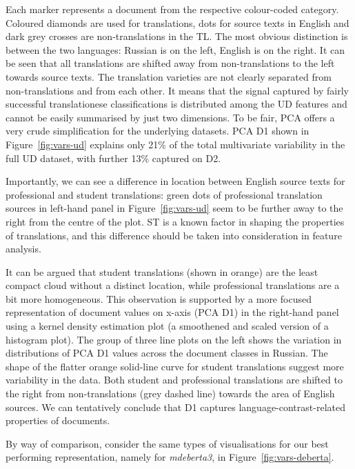 Each marker represents a document from the respective colour-coded category. Coloured diamonds are used for translations, dots for source texts in English and dark grey crosses are non-translations in the TL. 
The most obvious distinction is between the two languages: Russian is on the left, English is on the right. 
It can be seen that all translations are shifted away from non-translations to the left towards source texts. 
The translation varieties are not clearly separated from non-translations and from each other. It means that the signal captured by fairly successful translationese classifications is distributed among the UD features and cannot be easily summarised by just two dimensions.
To be fair, PCA offers a very crude simplification for the underlying datasets. PCA D1 shown in Figure~\ref{fig:vars-ud} explains only 21\% of the total multivariate variability in the full UD dataset, with further 13\% captured on D2. 

Importantly, we can see a difference in location between English source texts for professional and student translations: green dots of professional translation sources in left-hand panel in Figure~\ref{fig:vars-ud} seem to be further away to the right from the centre of the plot. ST is a known factor in shaping the properties of translations, and this difference should be taken into consideration in feature analysis. 

It can be argued that student translations (shown in orange) are the least compact cloud without a distinct location, while professional translations are a bit more homogeneous. This observation is supported by a more focused representation of document values on x-axis (PCA D1) in the right-hand panel using a kernel density estimation plot (a smoothened and scaled version of a histogram plot). The group of three line plots on the left shows the variation in distributions of PCA D1 values across the document classes in Russian. The shape of the flatter orange solid-line curve for student translations suggest more variability in the data. Both student and professional translations are shifted to the right from non-translations (grey dashed line) towards the area of English sources. We can tentatively conclude that D1 captures language-contrast-related properties of documents.

By way of comparison, consider the same types of visualisations for our best performing representation, namely for \textit{mdeberta3}, in Figure~\ref{fig:vars-deberta}. 

